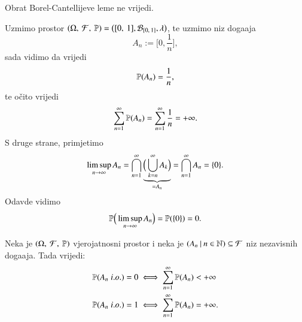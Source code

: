 \begin{nap} \label{nap:9.2-2}
    Obrat Borel-Cantellijeve leme ne vrijedi.

    Uzmimo prostor $(\Omega, \: \mathcal{F}, \: \mathbb{P}) = \big( [{0}, \:{1}], \mathcal{B}_{[{0}, \:{1}]}, \lambda \big)$, te uzmimo niz doga\dj aja
    \begin{equation*}
        A_n := \Big[0, \frac{1}{n} \Big],
    \end{equation*}
    sada vidimo da vrijedi
    \begin{equation*}
        \mathbb{P} (A_n) = \frac{1}{n},
    \end{equation*}
    te o\v cito vrijedi
    \begin{equation*}
        \sum\limits_{n = 1}^{\infty} \mathbb{P} (A_n) = \sum\limits_{n = 1}^{\infty} \frac{1}{n} = +\infty.
    \end{equation*}
    S druge strane, primjetimo
    \begin{equation*}
        \limsup\limits_{n \to \infty} A_n = \bigcap\limits_{n = 1}^{ \infty}  \underbrace{ \Big( \bigcup\limits_{k = n}^{\infty} A_k \Big) }_{= A_n} = \bigcap\limits_{n = 1}^{\infty} A_n = \{ 0 \}.
    \end{equation*}
    Odavde vidimo
    \begin{equation*}
        \mathbb{P} \Big( \limsup\limits_{n \to \infty} A_n \Big) = \mathbb{P} (\{ 0 \}) = 0.
    \end{equation*}
\end{nap}

\begin{tm}   \label{tm:9.3}
    Neka je $(\Omega, \: \mathcal{F}, \: \mathbb{P})$ vjerojatnosni prostor i neka je $({A_n} \: | \: {n \in \mathbb{N}}) \subseteq \mathcal{F}$ niz nezavisnih doga\dj aja.
    Tada vrijedi:
    \begin{equation*}
        \begin{aligned}
            \mathbb{P}({A_n \; i.o.}) = 0 &\iff \sum\limits_{n = 1}^{\infty} \mathbb{P}({A_n}) < +\infty\\
            \mathbb{P}({A_n \; i.o.}) = 1 &\iff \sum\limits_{n = 1}^{\infty} \mathbb{P}({A_n}) = +\infty.
        \end{aligned}
    \end{equation*}
\end{tm}

